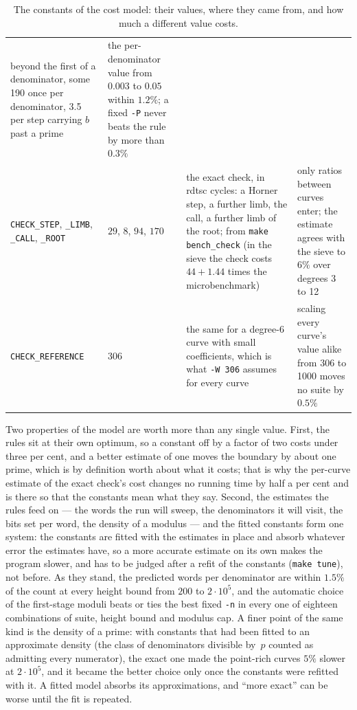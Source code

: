 \documentclass[12pt,a4paper,oneside]{amsart}
\begin{document}
\begin{table}[tbp]
\begin{tabular}{@{}P{4.0cm}P{1.7cm}P{5.6cm}P{5.6cm}@{}}
  beyond the first of a denominator, some 190 once per denominator, 3.5 per
  step carrying $b$ past a prime &
  the per-denominator value from $0.003$ to $0.05$ within $1.2\%$; a fixed
  \verb+-P+ never beats the rule by more than $0.3\%$ \\[3pt]
\texttt{CHECK\_STEP}, \texttt{\_LIMB}, \texttt{\_CALL}, \texttt{\_ROOT} &
  $29$, $8$, $94$, $170$ &
  the exact check, in rdtsc cycles: a Horner step, a further limb, the
  call, a further limb of the root; from \texttt{make bench\_check} (in the
  sieve the check costs $44 + 1.44$ times the microbenchmark) &
  only ratios between curves enter; the estimate agrees with the sieve to
  $6\%$ over degrees 3 to 12 \\[3pt]
\texttt{CHECK\_REFERENCE} & $306$ &
  the same for a degree-6 curve with small coefficients, which is what
  \verb+-W 306+ assumes for every curve &
  scaling every curve's value alike from 306 to 1000 moves no suite by
  $0.5\%$ \\
\end{tabular}
\caption{The constants of the cost model: their values, where they came
from, and how much a different value costs.}\label{tab:constants}
\end{table}

Two properties of the model are worth more than any single value. First,
the rules sit at their own optimum, so a constant off by a factor of two
costs under three per cent, and a better estimate of one moves the boundary
by about one prime, which is by definition worth about what it costs; that
is why the per-curve estimate of the exact check's cost changes no running
time by half a per cent and is there so that the constants mean what they
say. Second, the estimates the rules feed on --- the words the run will
sweep, the denominators it will visit, the bits set per word, the density
of a modulus --- and the fitted constants form one system: the constants are
fitted with the estimates in place and absorb whatever error the estimates
have, so a more accurate estimate on its own makes the program slower, and
has to be judged after a refit of the constants (\texttt{make tune}), not
before. As they stand, the predicted words per denominator are within
$1.5\%$ of the count at every height bound from $200$ to $2\cdot10^5$, and
the automatic choice of the first-stage moduli beats or ties the best fixed
\verb+-n+ in every one of eighteen combinations of suite, height bound and
modulus cap. A finer point of the same kind is the density of a prime: with
constants that had been fitted to an approximate density (the class of
denominators divisible by~$p$ counted as admitting every numerator), the
exact one made the point-rich curves $5\%$ slower at $2\cdot10^5$, and it
became the better choice only once the constants were refitted with it. A
fitted model absorbs its approximations, and ``more exact'' can be worse
until the fit is repeated.
\end{document}
